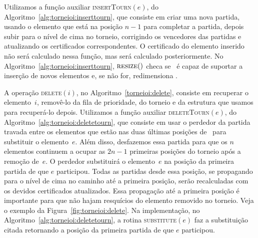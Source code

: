 



Utilizamos a função auxiliar \textsc{insertTourn}$(e)$, do Algoritmo~\ref{alg:torneioi:inserttourn},
que consiste em criar uma nova partida, usando o elemento que está na posição $n-1$ para completar
a partida, depois subir para o nível de cima no torneio, corrigindo os vencedores das partidas e
atualizando os certificados correspondentes.
O certificado do elemento inserido não será calculado nessa função, mas será calculado
posteriormente.
No Algoritmo~\ref{alg:torneioi:inserttourn}, $\textsc{resize}()$ checa se \torneio~é capaz de suportar
a inserção de novos elementos e, se não for, redimensiona \torneio.



A operação \textsc{delete}$(i)$, no Algoritmo~\ref{torneioi:delete}, consiste em recuperar o
elemento~$i$, removê-lo da fila de prioridade, do torneio e da estrutura que usamos para
recuperá-lo depois.
Utilizamos a função auxiliar \textsc{deleteTourn}$(e)$, do Algoritmo~\ref{alg:torneioi:deletetourn},
que consiste em usar o perdedor da partida travada entre os elementos que estão nas duas últimas
posições de \torneio~para substituir o elemento~$e$.
Além disso, desfazemos essa partida para que os $n$ elementos continuem a ocupar as $2n - 1$
primeiras posições do torneio após a remoção de~$e$.
O perdedor substituirá o elemento~$e$ na posição da primeira partida de que $e$ participou.
Todas as partidas desde essa posição, se propagando para o nível de cima no caminho até a primeira
posição, serão recalculadas com os devidos certificados atualizados.
Essa propagação até a primeira posição é importante para que não hajam resquícios do elemento
removido no torneio.
Veja o exemplo da Figura~\ref{fig:torneioi:delete}.
Na implementação, no Algoritmo~\ref{alg:torneioi:deletetourn}, a rotina \textsc{substitute}$(e)$ faz a
substituição citada retornando a posição da primeira partida de que $e$ participou.






